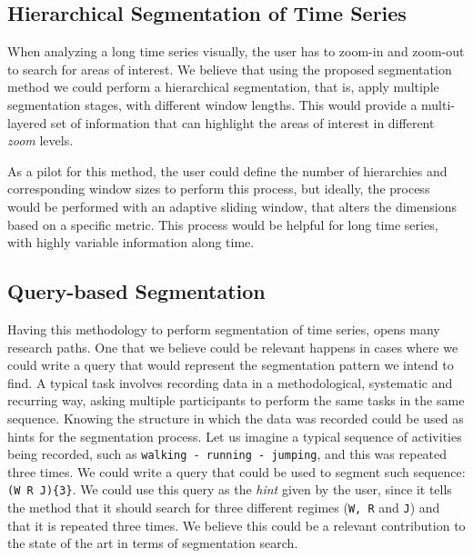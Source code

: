 

\subsection{Hierarchical Segmentation of Time Series}

When analyzing a long time series visually, the user has to zoom-in and zoom-out to search for areas of interest. We believe that using the proposed segmentation method we could perform a hierarchical segmentation, that is, apply multiple segmentation stages, with different window lengths. This would provide a multi-layered set of information that can highlight the areas of interest in different \textit{zoom} levels.
\par
As a pilot for this method, the user could define the number of hierarchies  and corresponding window sizes to perform this process, but ideally, the process would be performed with an adaptive sliding window, that alters the dimensions based on a specific metric. This process would be helpful for long time series, with highly variable information along time.

\subsection{Query-based Segmentation}

Having this methodology to perform segmentation of time series, opens many research paths. One that we believe could be relevant happens in cases where we could write a query that would represent the segmentation pattern we intend to find. A typical task involves recording data in a methodological, systematic and recurring way, asking multiple participants to perform the same tasks in the same sequence. Knowing the structure in which the data was recorded could be used as hints for the segmentation process. Let us imagine a typical sequence of activities being recorded, such as \texttt{walking - running - jumping}, and this was repeated three times. We could write a query that could be used to segment such sequence: \texttt{(W R J)\{3\}}. We could use this query as the \textit{hint} given by the user, since it tells the method that it should search for three different regimes (\texttt{W, R} and \texttt{J}) and that it is repeated three times. We believe this could be a relevant contribution to the state of the art in terms of segmentation search.

